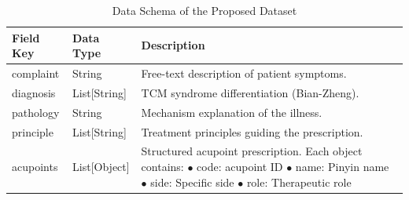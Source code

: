 \documentclass[preprint,5p,times,twocolumn,fleqn]{elsarticle}
\begin{document}
\FloatBarrier

\begin{table}[htbp]
    \centering
    \normalsize 
    \renewcommand{\arraystretch}{1.3}
    
    \caption{Data Schema of the Proposed Dataset}
    \label{tab:schema}
    
    \begin{tabularx}{\linewidth}{l l X}
        \toprule
        \textbf{Field Key} & \textbf{Data Type} & \textbf{Description} \\
        \midrule
        
        complaint & String & Free-text description of patient symptoms. \\
        
        diagnosis & List[String] & TCM syndrome differentiation (Bian-Zheng). \\
        
        pathology & String & Mechanism explanation of the illness. \\
        
        principle & List[String] & Treatment principles guiding the prescription. \\
        
        acupoints & List[Object] & Structured acupoint prescription. Each object contains: \newline
         $\bullet$ code: acupoint ID\newline
         $\bullet$ name: Pinyin name\newline
         $\bullet$ side: Specific side\newline
         $\bullet$ role: Therapeutic role \\
        \bottomrule
    \end{tabularx}
\end{table}

\twocolumn

\end{document}
